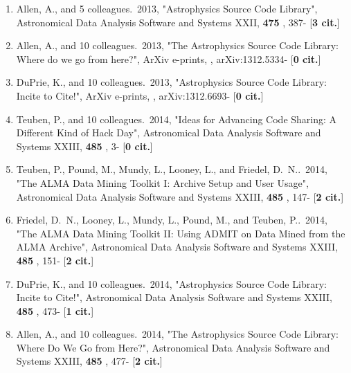 \documentclass[11pt,letterpaper]{article}
\begin{document}
\begin{enumerate}[resume,label=\textbf{\arabic*}.]
\item  
Allen, A., and 5 colleagues.\  2013,  "Astrophysics Source Code Library", 
Astronomical Data Analysis Software and Systems XXII,  {\bf 475} , 387- 
[{\bf 3 cit.}] 

\item  
Allen, A., and 10 colleagues.\  2013,  "The Astrophysics Source Code 
Library: Where do we go from here?", ArXiv e-prints,  , arXiv:1312.5334- 
[{\bf 0 cit.}] 

\item  
DuPrie, K., and 10 colleagues.\  2013,  "Astrophysics Source Code Library: 
Incite to Cite!", ArXiv e-prints,  , arXiv:1312.6693- [{\bf 0 cit.}] 


\item  
Teuben, P., and 10 colleagues.\  2014,  "Ideas for Advancing Code Sharing: 
A Different Kind of Hack Day", Astronomical Data Analysis Software and 
Systems XXIII,  {\bf 485} , 3- [{\bf 0 cit.}] 

\item  
Teuben, P., Pound, M., Mundy, L., Looney, L., and Friedel, D.~N..\  2014,  
"The ALMA Data Mining Toolkit I: Archive Setup and User Usage", 
Astronomical Data Analysis Software and Systems XXIII,  {\bf 485} , 147- 
[{\bf 2 cit.}] 

\item  
Friedel, D.~N., Looney, L., Mundy, L., Pound, M., and Teuben, P..\  2014,  
"The ALMA Data Mining Toolkit II: Using ADMIT on Data Mined from the ALMA 
Archive", Astronomical Data Analysis Software and Systems XXIII,  {\bf 485} 
, 151- [{\bf 2 cit.}] 

\item  
DuPrie, K., and 10 colleagues.\  2014,  "Astrophysics Source Code Library: 
Incite to Cite!", Astronomical Data Analysis Software and Systems XXIII,  
{\bf 485} , 473- [{\bf 1 cit.}] 

\item  
Allen, A., and 10 colleagues.\  2014,  "The Astrophysics Source Code 
Library: Where Do We Go from Here?", Astronomical Data Analysis Software 
and Systems XXIII,  {\bf 485} , 477- [{\bf 2 cit.}] 




\end{enumerate}
\end{document}
